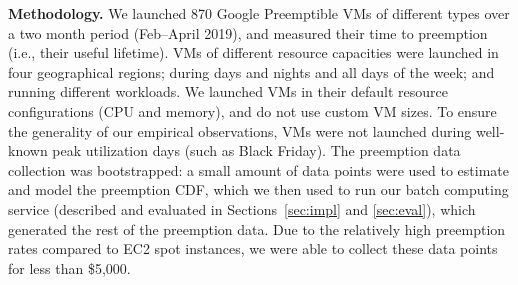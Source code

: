 

\noindent \textbf{Methodology.}
We launched  870 Google Preemptible VMs of different types over a two month period (Feb--April 2019), and measured their time to preemption (i.e., their useful lifetime).
%
VMs of different resource capacities were launched in four geographical regions; during days and nights and all days of the week; and running different workloads\footnotemark. 
We launched VMs in their default resource configurations (CPU and memory), and do not use custom VM sizes.
To ensure the generality of our empirical observations, VMs were not launched during well-known peak utilization days (such as Black Friday).
%
The preemption data collection was bootstrapped: a small amount of data points were used to estimate and model the preemption CDF, which we then used to run our batch computing service (described and evaluated in Sections~\ref{sec:impl} and \ref{sec:eval}), which generated the rest of the preemption data.  
%
Due to the relatively high preemption rates compared to EC2 spot instances, we were able to collect these data points for less than \$5,000. 
%


